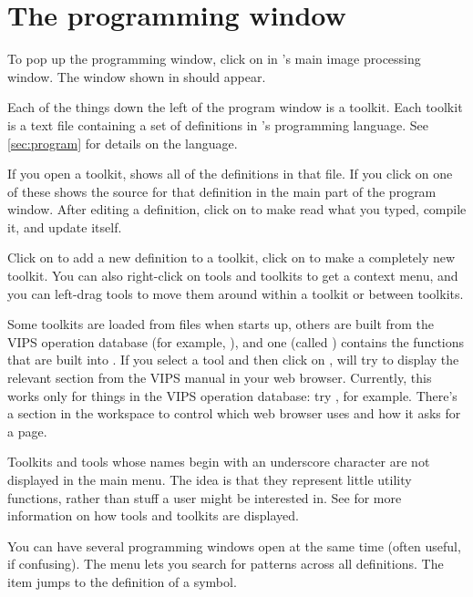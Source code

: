 \section{The programming window}

To pop up the programming window, click on  in
\nip{}'s main image processing window. The window shown in 
should appear.

Each of the things down the left of the program window 
is a toolkit. Each toolkit is a text
file containing a set of definitions in \nip{}'s programming language.
See \cref{sec:program} for details on the language.

If you open a toolkit, \nip{} shows all of the definitions in that file.
If you click on one of these
\nip{} shows the source for that definition in the main part of the
program window.  After editing a definition, click on  
to make \nip{} read what you typed, compile it, and update itself.

Click on  to add a new definition to a toolkit,
click on  to make a completely new toolkit. You
can also right-click on tools and toolkits to get a context menu, and you
can left-drag tools to move them around within a toolkit or between toolkits.

Some toolkits are loaded from files when \nip{} starts up, others are built
from the VIPS operation database (for example, ), and one 
(called ) contains the functions that are built into \nip{}. If
you select a tool and then click on , \nip{} will try to display the relevant section from the VIPS manual
in your web browser. Currently, this works only for things in the VIPS
operation database: try , for example.
There's a section in the  workspace to control which web
browser \nip{} uses and how it asks for a page.

Toolkits and tools whose names begin with an underscore character are not
displayed in the main  menu.  The idea is that they represent
little utility functions, rather than stuff a user might be interested in. See
 for more information on how tools and toolkits are displayed.

You can have several programming windows open at the same time (often useful,
if confusing). The  menu lets you search for patterns across all
definitions. The  item jumps to the definition of a
symbol. 


